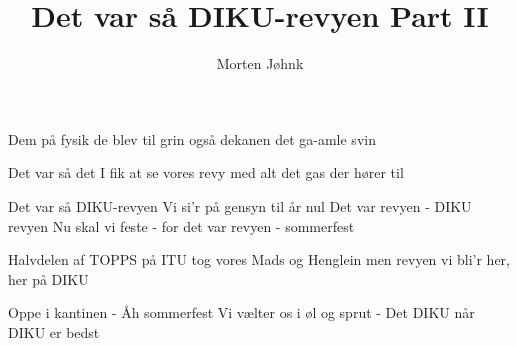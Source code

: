 \documentclass[danish]{article}
\title{Det var så DIKU-revyen Part II}
\author{Morten Jøhnk}
\begin{document}
\begin{song}
 Dem på fysik
               de blev til grin
               også dekanen
               det ga-amle svin
                  
               Det var så det
               I fik at se
               vores revy
               med alt det gas der hører til

 Det var så DIKU-revyen
               Vi si'r på gensyn til år nul
               Det var revyen - DIKU revyen
               Nu skal vi feste - for det var revyen
               - sommerfest

 Halvdelen af TOPPS
               på ITU
               tog vores Mads og Henglein
               men revyen vi bli'r her, her på DIKU

               Oppe i kantinen
               - Åh sommerfest
               Vi vælter os i øl og sprut
               - Det DIKU når DIKU er bedst


\end{song}
\end{document}
